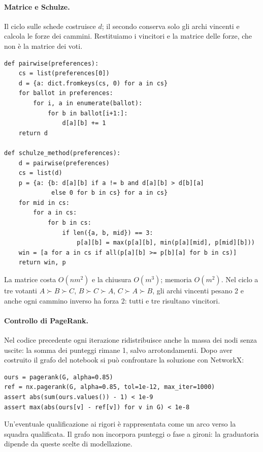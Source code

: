 \paragraph{Matrice e Schulze.} Il ciclo sulle schede costruisce $d$; il secondo conserva solo gli archi vincenti e calcola le forze dei cammini. Restituiamo i vincitori e la matrice delle forze, che non è la matrice dei voti.
\begin{lstlisting}
def pairwise(preferences):
    cs = list(preferences[0])
    d = {a: dict.fromkeys(cs, 0) for a in cs}
    for ballot in preferences:
        for i, a in enumerate(ballot):
            for b in ballot[i+1:]:
                d[a][b] += 1
    return d

def schulze_method(preferences):
    d = pairwise(preferences)
    cs = list(d)
    p = {a: {b: d[a][b] if a != b and d[a][b] > d[b][a]
             else 0 for b in cs} for a in cs}
    for mid in cs:
        for a in cs:
            for b in cs:
                if len({a, b, mid}) == 3:
                    p[a][b] = max(p[a][b], min(p[a][mid], p[mid][b]))
    win = [a for a in cs if all(p[a][b] >= p[b][a] for b in cs)]
    return win, p
\end{lstlisting}
La matrice costa $O(nm^2)$ e la chiusura $O(m^3)$; memoria $O(m^2)$. Nel ciclo a tre votanti $A\succ B\succ C$, $B\succ C\succ A$, $C\succ A\succ B$, gli archi vincenti pesano 2 e anche ogni cammino inverso ha forza 2: tutti e tre risultano vincitori.

\paragraph{Controllo di PageRank.} Nel codice precedente ogni iterazione ridistribuisce anche la massa dei nodi senza uscite: la somma dei punteggi rimane 1, salvo arrotondamenti. Dopo aver costruito il grafo del notebook si può confrontare la soluzione con NetworkX:
\begin{lstlisting}
ours = pagerank(G, alpha=0.85)
ref = nx.pagerank(G, alpha=0.85, tol=1e-12, max_iter=1000)
assert abs(sum(ours.values()) - 1) < 1e-9
assert max(abs(ours[v] - ref[v]) for v in G) < 1e-8
\end{lstlisting}
Un'eventuale qualificazione ai rigori è rappresentata come un arco verso la squadra qualificata. Il grafo non incorpora punteggi o fase a gironi: la graduatoria dipende da queste scelte di modellazione.

